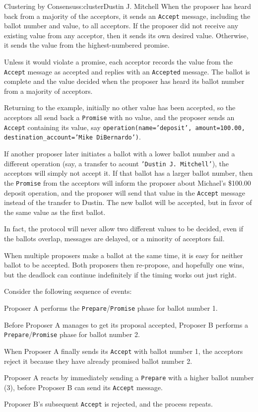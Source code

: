 \begin{aosachapter}{Clustering by Consensus}{s:cluster}{Dustin J. Mitchell}
When the proposer has heard back from a majority of the acceptors, it
sends an \texttt{Accept} message, including the ballot number and value,
to all acceptors. If the proposer did not receive any existing value
from any acceptor, then it sends its own desired value. Otherwise, it
sends the value from the highest-numbered promise.

Unless it would violate a promise, each acceptor records the value from
the \texttt{Accept} message as accepted and replies with an
\texttt{Accepted} message. The ballot is complete and the value decided
when the proposer has heard its ballot number from a majority of
acceptors.

Returning to the example, initially no other value has been accepted, so
the acceptors all send back a \texttt{Promise} with no value, and the
proposer sends an \texttt{Accept} containing its value, say
\texttt{operation(name='deposit', amount=100.00, destination\_account='Mike DiBernardo')}.

If another proposer later initiates a ballot with a lower ballot number
and a different operation (say, a transfer to acount
\texttt{'Dustin J. Mitchell'}), the acceptors will simply not accept it.
If that ballot has a larger ballot number, then the \texttt{Promise}
from the acceptors will inform the proposer about Michael's \$100.00
deposit operation, and the proposer will send that value in the
\texttt{Accept} message instead of the transfer to Dustin. The new
ballot will be accepted, but in favor of the same value as the first
ballot.

In fact, the protocol will never allow two different values to be
decided, even if the ballots overlap, messages are delayed, or a
minority of acceptors fail.

When multiple proposers make a ballot at the same time, it is easy for
neither ballot to be accepted. Both proposers then re-propose, and
hopefully one wins, but the deadlock can continue indefinitely if the
timing works out just right.

Consider the following sequence of events:

\begin{aosaitemize}

\item
  Proposer A performs the \texttt{Prepare}/\texttt{Promise} phase for
  ballot number 1.
\item
  Before Proposer A manages to get its proposal accepted, Proposer B
  performs a \texttt{Prepare}/\texttt{Promise} phase for ballot number
  2.
\item
  When Proposer A finally sends its \texttt{Accept} with ballot number
  1, the acceptors reject it because they have already promised ballot
  number 2.
\item
  Proposer A reacts by immediately sending a \texttt{Prepare} with a
  higher ballot number (3), before Proposer B can send its
  \texttt{Accept} message.
\item
  Proposer B's subsequent \texttt{Accept} is rejected, and the process
  repeats.
\end{aosaitemize}


\end{aosachapter}
